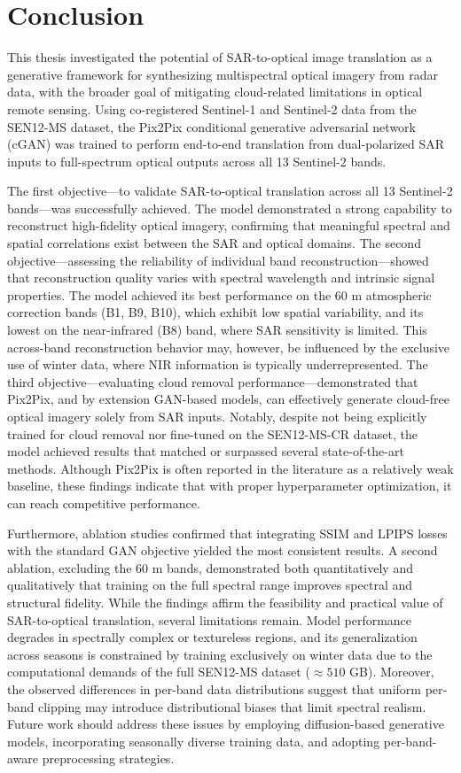 \chapter{Conclusion}
This thesis investigated the potential of SAR-to-optical image translation as a generative framework for synthesizing multispectral optical imagery from radar data, with the broader goal of mitigating cloud-related limitations in optical remote sensing. Using co-registered Sentinel-1 and Sentinel-2 data from the SEN12-MS dataset, the Pix2Pix conditional generative adversarial network (cGAN) was trained to perform end-to-end translation from dual-polarized SAR inputs to full-spectrum optical outputs across all 13 Sentinel-2 bands.

The first objective—to validate SAR-to-optical translation across all 13 Sentinel-2 bands—was successfully achieved. The model demonstrated a strong capability to reconstruct high-fidelity optical imagery, confirming that meaningful spectral and spatial correlations exist between the SAR and optical domains.
The second objective—assessing the reliability of individual band reconstruction—showed that reconstruction quality varies with spectral wavelength and intrinsic signal properties. The model achieved its best performance on the 60 m atmospheric correction bands (B1, B9, B10), which exhibit low spatial variability, and its lowest on the near-infrared (B8) band, where SAR sensitivity is limited. This across-band reconstruction behavior may, however, be influenced by the exclusive use of winter data, where NIR information is typically underrepresented.
The third objective—evaluating cloud removal performance—demonstrated that Pix2Pix, and by extension GAN-based models, can effectively generate cloud-free optical imagery solely from SAR inputs. Notably, despite not being explicitly trained for cloud removal nor fine-tuned on the SEN12-MS-CR dataset, the model achieved results that matched or surpassed several state-of-the-art methods. Although Pix2Pix is often reported in the literature as a relatively weak baseline, these findings indicate that with proper hyperparameter optimization, it can reach competitive performance.

Furthermore, ablation studies confirmed that integrating SSIM and LPIPS losses with the standard GAN objective yielded the most consistent results. A second ablation, excluding the 60 m bands, demonstrated both quantitatively and qualitatively that training on the full spectral range improves spectral and structural fidelity.
While the findings affirm the feasibility and practical value of SAR-to-optical translation, several limitations remain. Model performance degrades in spectrally complex or textureless regions, and its generalization across seasons is constrained by training exclusively on winter data due to the computational demands of the full SEN12-MS dataset ($\approx 510$ GB). Moreover, the observed differences in per-band data distributions suggest that uniform per-band clipping may introduce distributional biases that limit spectral realism. Future work should address these issues by employing diffusion-based generative models, incorporating seasonally diverse training data, and adopting per-band-aware preprocessing strategies.

